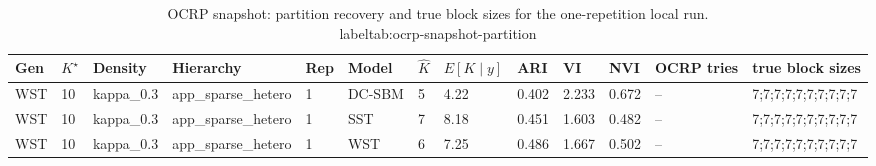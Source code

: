 \begin{table}[!h]
\centering
\caption{OCRP snapshot: partition recovery and true block sizes for the one-repetition local run.\\label{tab:ocrp-snapshot-partition}}
\centering
\begin{tabular}[t]{lllllllllllll}
\toprule
Gen & $K^\star$ & Density & Hierarchy & Rep & Model & $\hat K$ & $E[K\mid y]$ & ARI & VI & NVI & OCRP tries & true block sizes\\
\midrule
WST & 10 & kappa_0.3 & app_sparse_hetero & 1 & DC-SBM & 5 & 4.22 & 0.402 & 2.233 & 0.672 & -- & 7;7;7;7;7;7;7;7;7;7\\
WST & 10 & kappa_0.3 & app_sparse_hetero & 1 & SST & 7 & 8.18 & 0.451 & 1.603 & 0.482 & -- & 7;7;7;7;7;7;7;7;7;7\\
WST & 10 & kappa_0.3 & app_sparse_hetero & 1 & WST & 6 & 7.25 & 0.486 & 1.667 & 0.502 & -- & 7;7;7;7;7;7;7;7;7;7\\
\bottomrule
\end{tabular}
\end{table}
